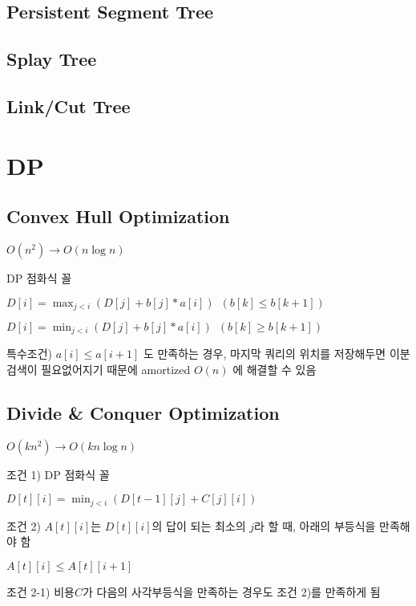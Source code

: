 \documentclass[10pt,landscape,a4paper,twocolumn]{article}
\begin{document}
\subsection{Persistent Segment Tree}


\subsection{Splay Tree}


\subsection{Link/Cut Tree}


\section{DP}

\subsection{Convex Hull Optimization}
$O(n^{2}) \to O(n\log{n})$

DP 점화식 꼴

$D[i] = \max_{j<i}( D[j] + b[j] * a[i] ) \phantom{1} (b[k] \leq b[k+1])$

$D[i] = \min_{j<i}( D[j] + b[j] * a[i] ) \phantom{1} (b[k] \geq b[k+1])$

특수조건) $a[i] \leq a[i+1]$ 도 만족하는 경우, 마지막 쿼리의 위치를 저장해두면 이분검색이 필요없어지기 때문에 amortized $O(n)$ 에 해결할 수 있음



\subsection{Divide \& Conquer Optimization}

$O(kn^{2}) \to O(kn\log{n})$

조건 1) DP 점화식 꼴

$D[t][i] = \min_{j<i}( D[t-1][j] + C[j][i] )$

조건 2) $A[t][i]$는 $D[t][i]$의 답이 되는 최소의 $j$라 할 때, 아래의 부등식을 만족해야 함

$A[t][i] \leq A[t][i+1]$

조건 2-1) 비용$C$가 다음의 사각부등식을 만족하는 경우도 조건 2)를 만족하게 됨
\end{document}
